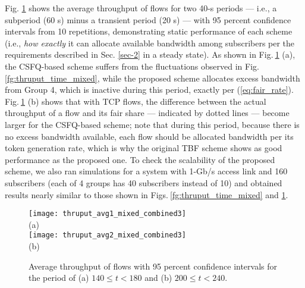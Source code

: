 \documentclass[conference,twoside,final]{IEEEtran}
\begin{document}
Fig. \ref{fg:thruput_avg} shows the average throughput of flows for two 40-s
periods --- i.e., a subperiod (60 s) minus a transient period (20 s) --- with 95
percent confidence intervals from 10 repetitions, demonstrating static
performance of each scheme (i.e., \emph{how exactly} it can allocate available
bandwidth among subscribers per the requirements described in
Sec. \ref{sec-2} in a steady state). As shown in
Fig.\(~\)\ref{fg:thruput_avg} (a), the CSFQ-based scheme suffers from the
fluctuations observed in Fig.\(~\)\ref{fg:thruput_time_mixed}, while the
proposed scheme allocates excess bandwidth from Group 4, which is inactive
during this period, exactly per
(\ref{eq:fair_rate}). Fig.\(~\)\ref{fg:thruput_avg} (b) shows that with TCP
flows, the difference between the actual throughput of a flow and its fair share
--- indicated by dotted lines --- become larger for the CSFQ-based scheme; note
that during this period, because there is no excess bandwidth available, each
flow should be allocated bandwidth per its token generation rate, which is why
the original TBF scheme shows as good performance as the proposed one. To check
the scalability of the proposed scheme, we also ran simulations for a system
with 1-Gb/s access link and 160 subscribers (each of 4 groups has 40 subscribers
instead of 10) and obtained results nearly similar to those shown in
Figs.\(~\)\ref{fg:thruput_time_mixed} and \ref{fg:thruput_avg}.
\begin{figure}[!htb]
    \begin{center}
        \texttt{[image: thruput\_avg1\_mixed\_combined3]}\\
        {\scriptsize (a)}\\
        \texttt{[image: thruput\_avg2\_mixed\_combined3]}\\
        {\scriptsize (b)}
    \end{center}
    \caption{Average throughput of flows with 95 percent confidence intervals
        for the period of (a) $140 \leq t < 180$ and (b) $200 \leq t < 240$.}
    \label{fg:thruput_avg}
\end{figure}
\end{document}
